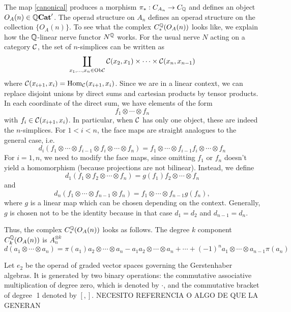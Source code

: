 \documentclass[TFM.tex]{subfiles}
\begin{document}
The map \ref{canonical} produces a morphism $\pi_*: C_{A_n}\to C_{\mathbb{Q}}$ and defines an object
$O_A(n)\in \mathbb{Q}\mathrm{\mathbf{Cat}}'$. The operad structure on $A_n$ defines an operad structure on the
collection $\{O_A(n)\}$. 
To see what the complex $C_*^{\mathbb{Q}}(O_A(n))$ looks like, we explain how the $\mathbb{Q}$-linear nerve functor $N^{\mathbb{Q}}$ works. For the usual nerve $N$ acting on a category $\mathcal{C}$, the set of $n$-simplices can be written as
\[
\coprod_{x_1,\dots, x_n\in\mathrm{Ob}\mathcal{C}}\mathcal{C}(x_2,x_1)\times\cdots \times\mathcal{C}(x_n,x_{n-1})
\]
where $\mathcal{C}(x_{i+1},x_i)=\operatorname{Hom}_{\mathcal{C}}(x_{i+1},x_i)$. Since we are in a linear context, we can replace disjoint unions by direct sums and cartesian products by tensor products. In each coordinate of the direct sum, we have elements of the form
\[
f_1\otimes\cdots \otimes f_n
\]
with $f_i\in \mathcal{C}(x_{i+1},x_i)$. In particular, when $\mathcal{C}$ has only one object, these are indeed the $n$-simplices. For $1<i<n$, the face maps are straight analogues to the general case, i.e. $$d_i(f_1\otimes\cdots \otimes f_{i-1}\otimes f_i\otimes \cdots\otimes f_n)=f_1\otimes\cdots \otimes f_{i-1}f_i\otimes\cdots \otimes f_n$$
For $i=1,n$, we need to modify the face maps, since omitting $f_1$ or $f_n$ doesn't yield a homomorphism (because projections are not bilinear). Instead, we define
\[
d_1(f_1\otimes f_2\otimes\cdots\otimes f_n)=g(f_1)f_2\otimes\cdots\otimes f_n
\]
and
\[
d_n(f_1\otimes\cdots\otimes f_{n-1}\otimes f_n)=f_1\otimes\cdots\otimes f_{n-1} g(f_n),
\]
where $g$ is a linear map which can be chosen depending on the context. Generally, $g$ is chosen not to be the identity because in that case $d_1=d_2$ and $d_{n-1}=d_n$. 

Thus, the complex $C_*^{\mathbb{Q}}(O_A(n))$ looks as follows. The degree $k$ component $C_k^{\mathbb{Q}}(O_A(n))$ is $A_n^{\otimes k}$ %
\[
d(a_1\otimes\cdots\otimes a_n)=\pi(a_1)a_2\otimes\cdots\otimes a_n-a_1a_2\otimes \cdots\otimes a_n+\cdots+(-1)^{n}a_1\otimes\cdots\otimes a_{n-1}\pi(a_n)
\]

Let $e_2$ be the operad of graded vector spaces governing the Gerstenhaber algebras.
It is generated by two binary operations: the commutative associative multiplication
of degree zero, which is denoted by $\cdot$, and the commutative bracket of degree 1 denoted by $[,]$. NECESITO REFERENCIA O ALGO DE QUE LA GENERAN
\end{document}
